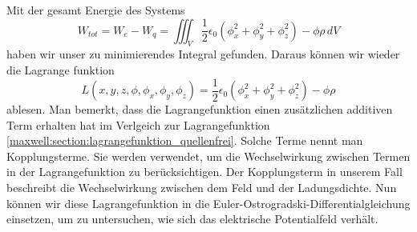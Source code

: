 Mit der gesamt Energie des Systems
\[
W_{tot}
=
W_e - W_q
=
\iiint_V \frac{1}{2}\epsilon_0\left(\phi_x^2 + \phi_y^2 + \phi_z^2\right) - \phi\rho\, dV
\]
haben wir unser zu minimierendes Integral gefunden.
Daraus können wir wieder die Lagrange funktion
\begin{equation}
L(x,y,z,\phi,\phi_x,\phi_y,\phi_z)
=
\frac{1}{2}\epsilon_0\left(\phi_x^2 + \phi_y^2 + \phi_z^2\right) - \phi\rho
\label{maxwell:section:lagrangefunktion_mit_quelle}
\end{equation}
ablesen.
Man bemerkt, dass die Lagrangefunktion einen zusätzlichen additiven Term erhalten hat im Verlgeich zur Lagrangefunktion \eqref{maxwell:section:lagrangefunktion_quellenfrei}.
Solche Terme nennt man Kopplungsterme.
Sie werden verwendet, um die Wechselwirkung zwischen Termen in der Lagrangefunktion zu berücksichtigen.
Der Kopplungsterm in unserem Fall beschreibt die Wechselwirkung zwischen dem Feld und der Ladungsdichte.
Nun können wir diese Lagrangefunktion in die Euler-Ostrogradski-Differentialgleichung einsetzen, um zu untersuchen, wie sich das elektrische Potentialfeld verhält.

